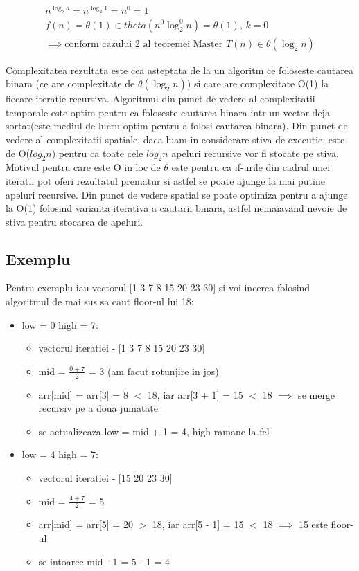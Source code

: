 \documentclass[runningheads]{llncs}
\begin{document}
\begin{gather*}
n^{\log_b a} = n^{\log_2 1} = n^{0} = 1 \\
f(n) = \theta(1) \in theta(n^{0}\log_2^{0} n) = \theta(1)\text{, }k = 0 \\
\implies \text{conform cazului 2 al teoremei Master } T(n) \in \theta(\log_2 n)
\end{gather*}

Complexitatea rezultata este cea asteptata de la un algoritm ce foloseste cautarea binara (ce are complexitate de $\theta(\log_2 n)$) si
care are complexitate O(1) la fiecare iteratie recursiva. Algoritmul din punct de vedere al complexitatii temporale este optim pentru
ca foloseste cautarea binara intr-un vector deja sortat(este mediul de lucru optim pentru a folosi cautarea binara). Din punct de vedere
al complexitatii spatiale, daca luam in considerare stiva de executie, este de O($log_2 n$) pentru ca toate cele $log_2 n$ apeluri recursive
vor fi stocate pe stiva. Motivul pentru care este O in loc de $\theta$ este pentru ca if-urile din cadrul unei iteratii pot oferi rezultatul
prematur si astfel se poate ajunge la mai putine apeluri recursive. Din punct de vedere spatial se poate optimiza pentru a ajunge la O(1)
folosind varianta iterativa a cautarii binara, astfel nemaiavand nevoie de stiva pentru stocarea de apeluri.
\subsection{Exemplu}
Pentru exemplu iau vectorul [1 3 7 8 15 20 23 30] si voi incerca folosind algoritmul de mai sus sa caut floor-ul lui 18:
\begin{itemize}
	\item low = 0 high = 7:
	\begin{itemize}
		\item vectorul iteratiei - [1 3 7 8 15 20 23 30]
		\item mid = $\frac{0 + 7}{2}$ = 3 (am facut rotunjire in jos)
		\item arr[mid] = arr[3] = 8 $<$ 18, iar arr[3 + 1] = 15 $<$ 18 $\implies$ se merge recursiv pe a doua jumatate
		\item se actualizeaza low = mid + 1 = 4, high ramane la fel
	\end{itemize}

	\item low = 4 high = 7:
	\begin{itemize}
		\item vectorul iteratiei - [15 20 23 30]
		\item mid = $\frac{4 + 7}{2}$ = 5
		\item arr[mid] = arr[5] = 20 $>$ 18, iar arr[5 - 1] = 15 $<$ 18 $\implies$ 15 este floor-ul
		\item se intoarce mid - 1 = 5 - 1 = 4
	\end{itemize}
\end{itemize}
\end{document}
